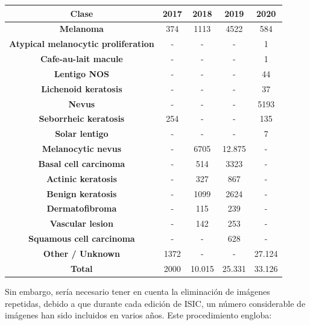 \begin{table}[H]
	\centering
	\begin{tabular}{|c|c|c|c|c|}
		\hline
		\textbf{Clase} & \textbf{2017} & \textbf{2018} & \textbf{2019} & \textbf{2020} \\ \hline
		\textbf{Melanoma} & 374 & 1113 & 4522 & 584 \\ \hline
		\textbf{Atypical melanocytic proliferation} & - & - & - & 1 \\ \hline
		\textbf{Cafe-au-lait macule} & - & - & - & 1 \\ \hline
		\textbf{Lentigo NOS} & - & - & - & 44 \\ \hline
		\textbf{Lichenoid keratosis} & - & - & - & 37 \\ \hline
		\textbf{Nevus} & - & - & - & 5193 \\ \hline
		\textbf{Seborrheic keratosis} & 254 & - & - & 135 \\ \hline
		\textbf{Solar lentigo} & - & - & - & 7 \\ \hline
		\textbf{Melanocytic nevus} & - & 6705 & 12.875 & - \\ \hline
		\textbf{Basal cell carcinoma} & - & 514 & 3323 & - \\ \hline
		\textbf{Actinic keratosis} & - & 327 & 867 & - \\ \hline
		\textbf{Benign keratosis} & - & 1099 & 2624 & - \\ \hline
		\textbf{Dermatofibroma} & - & 115 & 239 & - \\ \hline
		\textbf{Vascular lesion} & - & 142 & 253 & - \\ \hline
		\textbf{Squamous cell carcinoma} & - & - & 628 & - \\ \hline
		\textbf{Other / Unknown} & 1372 & - & - & 27.124 \\ \hline
		\textbf{Total} & 2000 & 10.015 & 25.331 & 33.126 \\ \hline
	\end{tabular}
\end{table}

Sin embargo, sería necesario tener en cuenta la eliminación de imágenes repetidas, debido a que durante cada edición de ISIC, un número considerable de imágenes han sido incluidos en varios años. Este procedimiento engloba:


